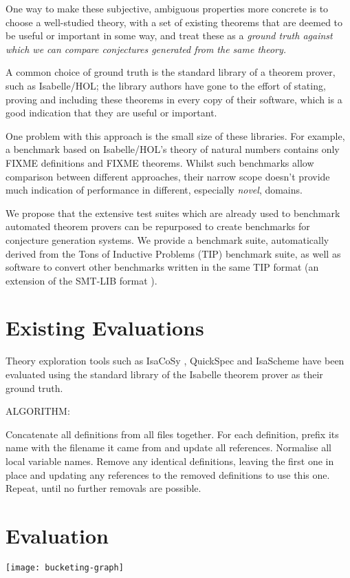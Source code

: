 \documentclass[12pt]{article}
\begin{document}
One way to make these subjective, ambiguous properties more concrete is to
choose a well-studied theory, with a set of existing theorems that are deemed to
be useful or important in some way, and treat these as a \em{ground truth}
against which we can compare conjectures generated from the same theory.

A common choice of ground truth is the standard library of a theorem prover,
such as Isabelle/HOL; the library authors have gone to the effort of stating,
proving and including these theorems in every copy of their software, which is a
good indication that they are useful or important.

One problem with this approach is the small size of these libraries. For
example, a benchmark based on Isabelle/HOL's theory of natural numbers contains
only FIXME definitions and FIXME theorems. Whilst such benchmarks allow
comparison between different approaches, their narrow scope doesn't provide much
indication of performance in different, especially \emph{novel}, domains.

We propose that the extensive test suites which are already used to benchmark
automated theorem provers can be repurposed to create benchmarks for conjecture
generation systems. We provide a benchmark suite, automatically derived from the
Tons of Inductive Problems (TIP) benchmark suite, as well as software to convert
other benchmarks written in the same TIP format (an extension of the SMT-LIB
format \cite{BarFT-SMTLIB}).

\section{Existing Evaluations}\label{previous approaches}

Theory exploration tools such as IsaCoSy \cite{Johansson.Dixon.Bundy:conjecture-generation}, QuickSpec and IsaScheme have been evaluated using the standard library of the Isabelle theorem prover as their ground truth.

ALGORITHM:

Concatenate all definitions from all files together.
For each definition, prefix its name with the filename it came from and update all references.
Normalise all local variable names.
Remove any identical definitions, leaving the first one in place and updating any references to the removed definitions to use this one.
Repeat, until no further removals are possible.

\section{Evaluation}

\texttt{[image: bucketing-graph]}



\end{document}
